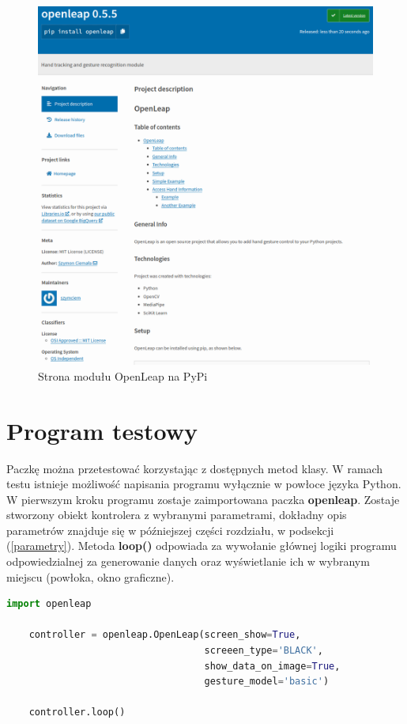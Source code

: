 \begin{figure}[H]
    \begin{center}
        \includegraphics[width=15cm]{../images/pypi_page.png}
        \caption{Strona modułu OpenLeap na PyPi}
    \end{center}
\end{figure}

\section{Program testowy}

\quad Paczkę można przetestować korzystając z dostępnych metod klasy. W ramach testu istnieje możliwość napisania programu wyłącznie w powłoce języka Python. W pierwszym kroku programu zostaje zaimportowana paczka \textbf{openleap}. Zostaje stworzony obiekt kontrolera z wybranymi parametrami, dokładny opis parametrów znajduje się w późniejszej części rozdziału, w podsekcji (\ref{parametry}). Metoda \textbf{loop()} odpowiada za wywołanie głównej logiki programu odpowiedzialnej za generowanie danych oraz wyświetlanie ich w wybranym miejscu (powłoka, okno graficzne). 

\begin{lstlisting}[language=python, style=programming, label={lst:simple_program}, caption={Program testowy}]
    import openleap

    controller = openleap.OpenLeap(screen_show=True, 
                                   screeen_type='BLACK', 
                                   show_data_on_image=True, 
                                   gesture_model='basic')
    
    controller.loop()
\end{lstlisting}

